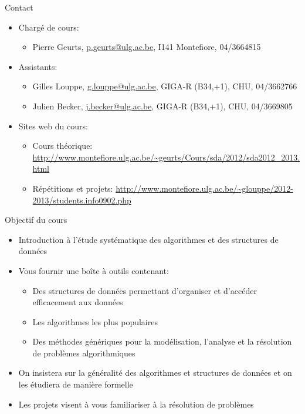 
\begin{frame}{Contact}
\begin{itemize}
\item Chargé de cours:
\begin{itemize}
\item Pierre Geurts, \url{p.geurts@ulg.ac.be}, I141 Montefiore, 04/3664815
\end{itemize}
\item Assistants:
\begin{itemize}
\item Gilles Louppe, \url{g.louppe@ulg.ac.be}, GIGA-R (B34,+1), CHU, 04/3662766
\item Julien Becker, \url{j.becker@ulg.ac.be}, GIGA-R (B34,+1), CHU, 04/3669805
\end{itemize}
\item Sites web du cours:
\begin{itemize}
\item Cours théorique:
{\small \url{http://www.montefiore.ulg.ac.be/~geurts/Cours/sda/2012/sda2012_2013.html}}
\item Répétitions et projets:
{\small \url{http://www.montefiore.ulg.ac.be/~glouppe/2012-2013/students.info0902.php}}
\end{itemize}
\end{itemize}
\end{frame}

\begin{frame}{Objectif du cours}

\begin{itemize}
\item Introduction à l'étude systématique des algorithmes et des
  structures de données
\item Vous fournir une boîte à outils contenant:
\begin{itemize}
\item Des structures de données permettant d'organiser et d'accéder efficacement
  aux données
\item Les algorithmes les plus populaires
\item Des méthodes génériques pour la modélisation, l'analyse et la résolution de problèmes algorithmiques
\end{itemize}
\item On insistera sur la généralité des algorithmes et structures de données et on les étudiera de manière formelle
\item Les projets visent à vous familiariser à la résolution de problèmes
\end{itemize}

\end{frame}

